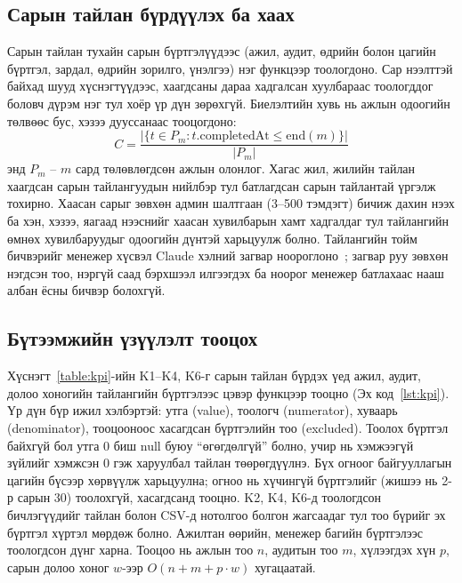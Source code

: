 \subsection{Сарын тайлан бүрдүүлэх ба хаах}
Сарын тайлан тухайн сарын бүртгэлүүдээс (ажил, аудит, өдрийн болон цагийн бүртгэл, зардал, өдрийн зорилго, үнэлгээ) нэг функцээр тоологдоно. Сар нээлттэй байхад шууд хүснэгтүүдээс, хаагдсаны дараа хадгалсан хуулбараас тоологддог боловч дүрэм нэг тул хоёр үр дүн зөрөхгүй. Биелэлтийн хувь нь ажлын одоогийн төлвөөс бус, хэзээ дууссанаас тооцогдоно:
\begin{equation}
C = \frac{\left|\{t \in P_m : t.\mathrm{completedAt} \le \mathrm{end}(m)\}\right|}{|P_m|}
\end{equation}
энд $P_m$ -- $m$ сард төлөвлөгдсөн ажлын олонлог. Хагас жил, жилийн тайлан хаагдсан сарын тайлангуудын нийлбэр тул батлагдсан сарын тайлантай үргэлж тохирно. Хаасан сарыг зөвхөн админ шалтгаан (3--500 тэмдэгт) бичиж дахин нээх ба хэн, хэзээ, яагаад нээснийг хаасан хувилбарын хамт хадгалдаг тул тайлангийн өмнөх хувилбаруудыг одоогийн дүнтэй харьцуулж болно. Тайлангийн тойм бичвэрийг менежер хүсвэл Claude хэлний загвар ноороглоно~\cite{anthropic}; загвар руу зөвхөн нэгдсэн тоо, нэргүй саад бэрхшээл илгээгдэх ба ноорог менежер батлахаас нааш албан ёсны бичвэр болохгүй.

\subsection{Бүтээмжийн үзүүлэлт тооцох}
\label{sec:kpialgo}
Хүснэгт~\ref{table:kpi}-ийн K1--K4, K6-г сарын тайлан бүрдэх үед ажил, аудит, долоо хоногийн тайлангийн бүртгэлээс цэвэр функцээр тооцно (Эх код~\ref{lst:kpi}). Үр дүн бүр ижил хэлбэртэй: утга (value), тоологч (numerator), хуваарь (denominator), тооцооноос хасагдсан бүртгэлийн тоо (excluded). Тоолох бүртгэл байхгүй бол утга 0 биш null буюу ``өгөгдөлгүй'' болно, учир нь хэмжээгүй зүйлийг хэмжсэн 0 гэж харуулбал тайлан төөрөгдүүлнэ. Бүх огноог байгууллагын цагийн бүсээр хөрвүүлж харьцуулна; огноо нь хүчингүй бүртгэлийг (жишээ нь 2-р сарын 30) тоолохгүй, хасагдсанд тооцно. K2, K4, K6-д тоологдсон бичлэгүүдийг тайлан болон CSV-д нотолгоо болгон жагсаадаг тул тоо бүрийг эх бүртгэл хүртэл мөрдөж болно. Ажилтан өөрийн, менежер багийн бүртгэлээс тоологдсон дүнг харна. Тооцоо нь ажлын тоо $n$, аудитын тоо $m$, хүлээгдэх хүн $p$, сарын долоо хоног $w$-ээр $O(n + m + p \cdot w)$ хугацаатай.


